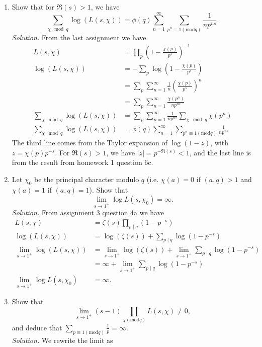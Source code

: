 \documentclass[12pt]{article}
\begin{document}
\begin{enumerate}[label=(\alph*)]
    \item Show that for $\Re(s)>1$, we have 
    \[
        \sum_{\chi\mod q}\log(L(s,\chi))=\phi(q)\sum_{n=1}^\infty\sum_{p^n\equiv 1(\text{mod} q)}\frac{1}{np^{ns}}.
    \]
    \textit{Solution.} From the last assignment we have
    \begin{align*}
        L(s,\chi)&=\prod_{p}\left(1-\frac{\chi(p)}{p^s}\right)^{-1}\\
        \log(L(s,\chi))&=-\sum_{p}\log\left(1-\frac{\chi(p)}{p^s}\right)\\
        &=\sum_{p}\sum_{n=1}^{\infty}\frac{1}{n}\left(\frac{\chi(p)}{p^s}\right)^n\\
        &=\sum_{p}\sum_{n=1}^{\infty}\frac{\chi(p^n)}{np^{ns}}\\
        \sum_{\chi\mod q}\log(L(s,\chi))&=\sum_{p}\sum_{n=1}^{\infty}\frac{1}{np^{ns}}\sum_{\chi\mod q}\chi(p^n)\\
        \sum_{\chi\mod q}\log(L(s,\chi))&=\phi(q)\sum_{n=1}^\infty\sum_{p^n\equiv 1(\text{mod} q)}\frac{1}{np^{ns}}
    \end{align*}
    The third line comes from the Taylor expansion of $\log(1-z)$, with $z=\chi(p)p^{-s}$. For $\Re(s)>1$, we have $|z|=p^{-\Re(s)}<1$, and the last line is from the result from homework 1 question 6c.
    \item Let $\chi_0$ be the principal character modulo $q$ (i.e. $\chi(a)=0$ if $(a,q)>1$ and $\chi(a)=1$ if $(a,q)=1$). Show that 
    \[
        \lim_{s\to1^{+}}\log L(s,\chi_0)=\infty.
    \]
    \textit{Solution.} From assignment 3 question 4a we have
    \begin{align*}
        L(s,\chi)&=\zeta(s)\prod_{p\mid q}(1-p^{-s})\\
        \log(L(s,\chi))&=\log(\zeta(s))+\sum_{p\mid q}\log(1-p^{-s})\\
        \lim_{s\to1^{+}}\log(L(s,\chi))&=\lim_{s\to1^{+}}\log(\zeta(s))+\lim_{s\to1^{+}}\sum_{p\mid q}\log(1-p^{-s})\\
        &=\infty+\lim_{s\to1^{+}}\sum_{p\mid q}\log(1-p^{-s})\\
        \lim_{s\to1^{+}}\log L(s,\chi_0)&=\infty.
    \end{align*}
    \item Show that 
    \[
        \lim_{s\to1^{+}}(s-1)\prod_{\chi(\text{mod}q)}L(s,\chi)\neq 0,
    \] 
    and deduce that $\sum_{p\equiv1(\text{mod} q)}\frac{1}{p}=\infty$.\\
    \textit{Solution.} We rewrite the limit as 

\end{enumerate}
\end{document}
